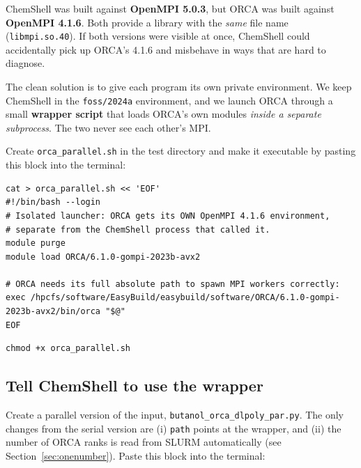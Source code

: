 \documentclass[12pt,a4paper]{article}
\begin{document}
ChemShell was built against \textbf{OpenMPI 5.0.3}, but ORCA was built against
\textbf{OpenMPI 4.1.6}. Both provide a library with the \emph{same} file name
(\texttt{libmpi.so.40}). If both versions were visible at once, ChemShell could
accidentally pick up ORCA's 4.1.6 and misbehave in ways that are hard to
diagnose.

The clean solution is to give each program its own private environment. We keep
ChemShell in the \texttt{foss/2024a} environment, and we launch ORCA through a
small \textbf{wrapper script} that loads ORCA's own modules \emph{inside a
separate subprocess}. The two never see each other's MPI.

Create \texttt{orca\_parallel.sh} in the test directory and make it executable
by pasting this block into the terminal:

\begin{lstlisting}[style=shell]
cat > orca_parallel.sh << 'EOF'
#!/bin/bash --login
# Isolated launcher: ORCA gets its OWN OpenMPI 4.1.6 environment,
# separate from the ChemShell process that called it.
module purge
module load ORCA/6.1.0-gompi-2023b-avx2

# ORCA needs its full absolute path to spawn MPI workers correctly:
exec /hpcfs/software/EasyBuild/easybuild/software/ORCA/6.1.0-gompi-2023b-avx2/bin/orca "$@"
EOF
\end{lstlisting}

\begin{lstlisting}[style=shell]
chmod +x orca_parallel.sh
\end{lstlisting}

\subsection{Tell ChemShell to use the wrapper}

Create a parallel version of the input, \texttt{butanol\_orca\_dlpoly\_par.py}.
The only changes from the serial version are (i) \texttt{path} points at the
wrapper, and (ii) the number of ORCA ranks is read from SLURM automatically (see
Section~\ref{sec:onenumber}). Paste this block into the terminal:\\
\end{document}
